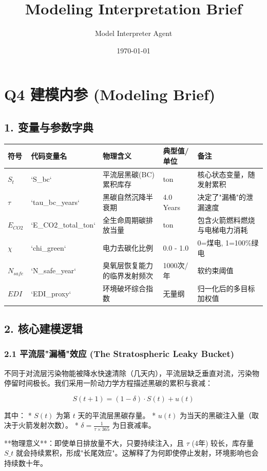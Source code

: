 \documentclass{article}
\title{Modeling Interpretation Brief}
\author{Model Interpreter Agent}
\date{\today}
\begin{document}
\maketitle
\section*{Q4 建模内参 (Modeling Brief)}
\par
\subsection*{1. 变量与参数字典}
\par
\begin{center}
\begin{longtable}{lllll}
\toprule
符号 & 代码变量名 & 物理含义 & 典型值/单位 & 备注 \\
\midrule
$S_t$ & `S\_bc` & 平流层黑碳(BC)累积库存 & ton & 核心状态变量，随发射累积 \\
$\tau$ & `tau\_bc\_years` & 黑碳自然沉降半衰期 & 4.0 Years & 决定了"漏桶"的泄漏速度 \\
$E_{CO2}$ & `E\_CO2\_total\_ton` & 全生命周期碳排放当量 & ton & 包含火箭燃料燃烧与电梯电力消耗 \\
$\chi$ & `chi\_green` & 电力去碳化比例 & 0.0 - 1.0 & 0=煤电, 1=100\%绿电 \\
$N_{safe}$ & `N\_safe\_year` & 臭氧层恢复能力的临界发射频次 & 1000次/年 & 软约束阈值 \\
$EDI$ & `EDI\_proxy` & 环境破坏综合指数 & 无量纲 & 归一化后的多目标加权值 \\
\bottomrule
\end{longtable}
\end{center}
\par
\subsection*{2. 核心建模逻辑}
\par
\subsubsection*{2.1 平流层"漏桶"效应 (The Stratospheric Leaky Bucket)}
不同于对流层污染物能被降水快速清除（几天内），平流层缺乏垂直对流，污染物停留时间极长。我们采用一阶动力学方程描述黑碳的累积与衰减：
\par
\[  S(t+1) = (1 - \delta) \cdot S(t) + u(t)  \]
\par
其中：
*   $S(t)$ 为第 $t$ 天的平流层黑碳存量。
*   $u(t)$ 为当天的黑碳注入量（取决于火箭发射次数）。
*   $\delta = \frac{1}{\tau \times 365}$ 为日衰减率。
\par
**物理意义**：即使单日排放量不大，只要持续注入，且 $\tau$ (4年) 较长，库存量 $S\_t$ 就会持续累积，形成"长尾效应"。这解释了为何即使停止发射，环境影响也会持续数十年。
\par
\end{document}
